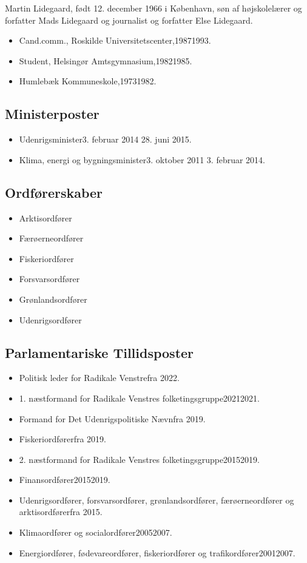 \documentclass[11pt, a4paper]{awesome-cv}
\begin{document}
\makecvheader[R]
\makelettertitle
\begin{cvletter}
Martin Lidegaard, født 12. december 1966 i København, søn af højskolelærer og forfatter Mads Lidegaard og journalist og forfatter Else Lidegaard.

\begin{itemize}
\item Cand.comm., Roskilde Universitetscenter,19871993.
\item Student, Helsingør Amtsgymnasium,19821985.
\item Humlebæk Kommuneskole,19731982.
\end{itemize}
\subsection*{Ministerposter}
\begin{itemize}
\item Udenrigsminister3. februar 2014  28. juni 2015.
\item Klima, energi og bygningsminister3. oktober 2011  3. februar 2014.
\end{itemize}
\subsection*{Ordførerskaber}
\begin{itemize}
\item Arktisordfører
\item Færøerneordfører
\item Fiskeriordfører
\item Forsvarsordfører
\item Grønlandsordfører
\item Udenrigsordfører
\end{itemize}
\subsection*{Parlamentariske Tillidsposter}
\begin{itemize}
\item Politisk leder for Radikale Venstrefra 2022.
\item 1. næstformand for Radikale Venstres folketingsgruppe20212021.
\item Formand for Det Udenrigspolitiske Nævnfra 2019.
\item Fiskeriordførerfra 2019.
\item 2. næstformand for Radikale Venstres folketingsgruppe20152019.
\item Finansordfører20152019.
\item Udenrigsordfører, forsvarsordfører, grønlandsordfører, færøerneordfører og arktisordførerfra 2015.
\item Klimaordfører og socialordfører20052007.
\item Energiordfører, fødevareordfører, fiskeriordfører og trafikordfører20012007.
\end{itemize}

\end{cvletter}
\end{document}
